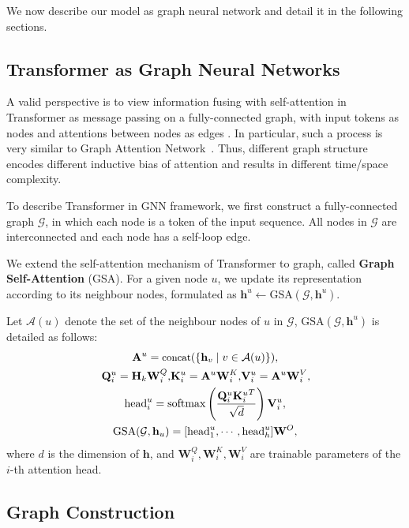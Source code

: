 \documentclass[11pt,a4paper]{article}
\begin{document}
We now describe our model as graph neural network and detail it in the following sections.

\subsection{Transformer as Graph Neural Networks}
\label{sec:trans-gnn}

A valid perspective is to view information fusing with self-attention in Transformer as message passing on a fully-connected graph, with input tokens as nodes and attentions between nodes as edges \cite{battaglia2018relational}. In particular, such a process is very similar to Graph Attention Network~\cite{velickovic2017graph}. Thus, different graph structure encodes different inductive bias of attention and results in different time/space complexity.

To describe Transformer in GNN framework, we first construct a fully-connected graph $\mathcal{G}$, in which each node is a token of the input sequence.  All nodes in $\mathcal{G}$ are interconnected and each node has a self-loop edge.

We extend the self-attention mechanism of Transformer to graph, called \textbf{Graph Self-Attention} (GSA). For a given node $u$, we update its representation according to its neighbour nodes, formulated as $\mathbf{h}^u \leftarrow \mathrm{GSA}(\mathcal{G}, \mathbf{h}^u)$.

Let $\mathcal{A}(u)$ denote the set of the neighbour nodes of $u$ in $\mathcal{G}$, $\mathrm{GSA}(\mathcal{G}, \mathbf{h}^u)$ is detailed as follows:
\begin{gather}\small
    \mathbf{A}^u = \text{concat}(\{\mathbf{h}_v \mid v \in \mathcal{A}(u)\}), \\
    \mathbf{Q}^u_i = \mathbf{H}_k \mathbf{W}_i^Q,\!  \mathbf{K}^u_i = \mathbf{A}^u \mathbf{W}_i^K,\!  \mathbf{V}^u_i = \mathbf{A}^u \mathbf{W}_i^V,\! \\ \mathrm{head}_i^u = \text{softmax}\left(\dfrac{\mathbf{Q}^u_i {\mathbf{K}^u_i}^T}{\sqrt{d}}\right) \mathbf{V}^u_i, \label{eqn:no-relpos}\\
    \text{GSA}(\mathcal{G}, \mathbf{h}_u) = [\mathrm{head}^u_1,\cdots,\mathrm{head}^u_h] \mathbf{W}^O,
\end{gather}
where $d$ is the dimension of $\mathbf{\mathbf{h}}$, and $\mathbf{W}^Q_i, \mathbf{W}^K_i, \mathbf{W}^V_i$ are trainable parameters of the $i$-th attention head.



\subsection{Graph Construction}
\end{document}
